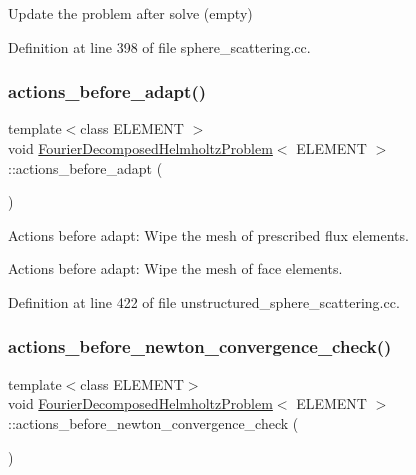 Update the problem after solve (empty) 



Definition at line 398 of file sphere\+\_\+scattering.\+cc.

\mbox{\label{classFourierDecomposedHelmholtzProblem_acbc6f3c692463e5a098ccec7fe9029c1}} 
\subsubsection{\texorpdfstring{actions\+\_\+before\+\_\+adapt()}{actions\_before\_adapt()}}
{\footnotesize\ttfamily template$<$class E\+L\+E\+M\+E\+NT $>$ \\
void \hyperlink{classFourierDecomposedHelmholtzProblem}{Fourier\+Decomposed\+Helmholtz\+Problem}$<$ E\+L\+E\+M\+E\+NT $>$\+::actions\+\_\+before\+\_\+adapt (\begin{DoxyParamCaption}{ }\end{DoxyParamCaption})}



Actions before adapt\+: Wipe the mesh of prescribed flux elements. 

Actions before adapt\+: Wipe the mesh of face elements. 

Definition at line 422 of file unstructured\+\_\+sphere\+\_\+scattering.\+cc.

\mbox{\label{classFourierDecomposedHelmholtzProblem_ae80673ef299e4935ddcac177ed919da3}} 
\subsubsection{\texorpdfstring{actions\+\_\+before\+\_\+newton\+\_\+convergence\+\_\+check()}{actions\_before\_newton\_convergence\_check()}\hspace{0.1cm}{\footnotesize\ttfamily [1/2]}}
{\footnotesize\ttfamily template$<$class E\+L\+E\+M\+E\+NT$>$ \\
void \hyperlink{classFourierDecomposedHelmholtzProblem}{Fourier\+Decomposed\+Helmholtz\+Problem}$<$ E\+L\+E\+M\+E\+NT $>$\+::actions\+\_\+before\+\_\+newton\+\_\+convergence\+\_\+check (\begin{DoxyParamCaption}{ }\end{DoxyParamCaption})\hspace{0.3cm}{\ttfamily [inline]}}



